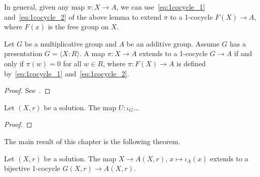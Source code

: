 

In general, given any map $\pi\colon X\to A$, we can use~\eqref{eq:1cocycle_1} and~\eqref{eq:1cocycle_2} of the above lemma 
to extend $\pi$ to a 1-cocycle $F(X)\to A$, where $F(x)$ is the free group on $X$.

\begin{lemma}
\label{lem:HEO}
Let $G$ be a multiplicative group and $A$ be an additive group. 
Assume $G$ has a presentation $G=\langle X:R\rangle$. A map $\pi\colon X\to A$ extends to a 1-cocycle
$G\to A$ if and only if $\pi(w)=0$ for all $w\in R$, where 
$\pi\colon F(X)\to A$ is defined by~\eqref{eq:1cocycle_1} and~\eqref{eq:1cocycle_2}.
\end{lemma}

\begin{proof}
See~\cite[Theorem 2.78]{MR2129747}.
\end{proof}

\begin{lemma}
    Let $(X,r)$ be a solution. The map $U\colon \iota_G$...
\end{lemma}

\begin{proof}

\end{proof}

The main result of this chapter is the following theorem. 

\begin{theorem}
    \label{thm:G->A}
    Let $(X,r)$ be a solution. The map $X\to A(X,r)$, $x\mapsto\iota_A(x)$ 
    extends to a bijective 1-cocycle $G(X,r)\to A(X,r)$.
\end{theorem}


